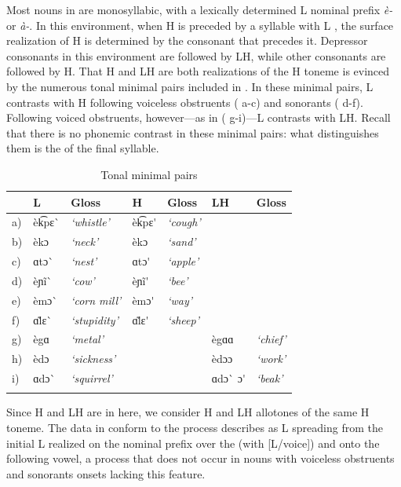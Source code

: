 \documentclass[output=paper
,newtxmath
,modfonts
,nonflat]{langsci/langscibook}
\begin{document}
Most nouns in  are monosyllabic, with a lexically determined L  nominal prefix \textit{è-} or \textit{à-}. In this environment, when H  is preceded by a syllable with L , the surface realization of H is determined by the consonant that precedes it. Depressor consonants in this environment are followed by LH, while other consonants are followed by H. That H and LH are both realizations of the H toneme is evinced by the numerous tonal minimal pairs included in . In these minimal pairs, L contrasts with H following voiceless obstruents ( a-c) and sonorants ( d-f). Following voiced obstruents, however—as in ( g-i)—L contrasts with LH. Recall that there is no phonemic  contrast in these minimal pairs: what distinguishes them is the  of the final syllable.

\begin{table}
\begin{tabularx}{\textwidth}{Xllllll} 
\lsptoprule
& {L}  & {Gloss} & {H} & {Gloss} & {LH}  & {Gloss}\\
\midrule
{a)} & èk͡pɛ\`{}  & \textit{‘whistle’} & èk͡pɛ\'{}  & \textit{‘cough’} &  & \\
{b)} & èkɔ & \textit{‘neck’} & èkɔ & \textit{‘sand’} &  & \\
{c)} & ɑtɔ\`{}  & \textit{‘nest’} & ɑtɔ\'{}  & \textit{‘apple’} &  & \\
{d)} & èɲĩ\`{}  & \textit{‘cow’} & èɲĩ\'{}  & \textit{‘bee’} &  & \\
{e)} & èmɔ\`{}  & \textit{‘corn mill’} & èmɔ\'{}  & \textit{‘way’} &  & \\
{f)} & ɑ\~{l}ɛ\`{}  & \textit{‘stupidity’} & ɑ\~{l}ɛ\'{}  & \textit{‘sheep’} &  & \\
{g)} & ègɑ & \textit{‘metal’} &  &  & ègɑɑ & \textit{‘chief’}\\
{h)} & èdɔ & \textit{‘sickness’} &  &  & èdɔɔ & \textit{‘work’}\\
{i)} & ɑdɔ\`{}  & \textit{‘squirrel’} &  &  & ɑdɔ\`{} ɔ\'{}  & \textit{‘beak’}\\
\lspbottomrule
\end{tabularx}
\caption{Tonal minimal pairs}
\label{tab:lotven:1}
\end{table}

Since H and LH  are in  here, we consider H and LH  allotones of the same H toneme. The data in  conform to the process \citet{Bradshaw1999} describes as L  spreading from the initial L  realized on the nominal prefix over the  (with [L/voice]) and onto the following vowel, a process that does not occur in nouns with voiceless obstruents and sonorants onsets lacking this feature. 
\end{document}
